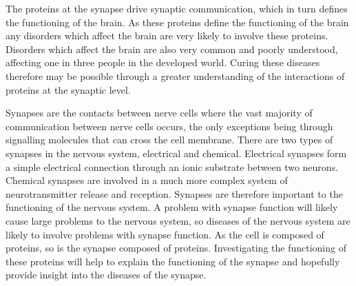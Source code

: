 The proteins at the synapse drive synaptic communication, which in turn defines the functioning of the brain.  %
As these proteins define the functioning of the brain any disorders which affect the brain are very likely to involve these proteins.  %
Disorders which affect the brain are also very common and poorly understood, affecting one in three people in the developed world. %
Curing these diseases therefore may be possible through a greater understanding of the interactions of proteins at the synaptic level\autocites{synsys,chua_architecture_2010}.

Synapses are the contacts between nerve cells where the vast majority of communication between nerve cells occurs, the only exceptions being through signalling molecules that can cross the cell membrane.
There are two types of synapses in the nervous system, electrical and chemical\autocite{kandel_principles_2000}.
Electrical synapses form a simple electrical connection through an ionic substrate between two neurons.
Chemical synapses are involved in a much more complex system of neurotransmitter release and reception.
Synapses are therefore important to the functioning of the nervous system. 
A problem with synapse function will likely cause large problems to the nervous system, so diseases of the nervous system are likely to involve problems with synapse function. %
As the cell is composed of proteins, so is the synapse composed of proteins. %
Investigating the functioning of these proteins will help to explain the functioning of the synapse and hopefully provide insight into the diseases of the synapse.%

